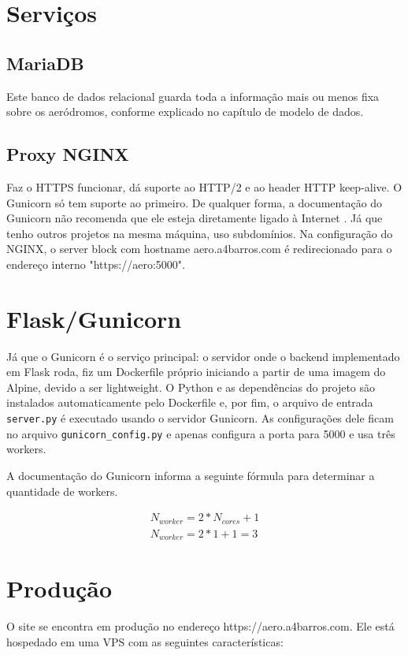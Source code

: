 \section{Serviços}

\subsection{MariaDB}
Este banco de dados relacional guarda toda a informação mais ou menos fixa sobre os aeródromos,
conforme explicado no capítulo de modelo de dados.

\subsection{Proxy NGINX}
Faz o HTTPS funcionar, dá suporte ao HTTP/2 e ao header HTTP keep-alive. O Gunicorn só tem suporte
ao primeiro. De qualquer forma, a documentação do Gunicorn não recomenda que ele esteja diretamente
ligado à Internet \cite{nginx-gunicorn}. Já que tenho outros projetos na mesma máquina, uso subdomínios.
Na configuração do NGINX, o server block com hostname aero.a4barros.com é redirecionado para 
o endereço interno "https://aero:5000".

\section{Flask/Gunicorn}

Já que o Gunicorn é o serviço principal: o servidor onde o backend implementado em Flask roda,
fiz um Dockerfile próprio iniciando a partir de uma imagem do Alpine, devido a ser lightweight.
O Python e as dependências do projeto são instalados automaticamente pelo Dockerfile e, por
fim, o arquivo de entrada \texttt{server.py} é executado usando o servidor Gunicorn. As configurações
dele ficam no arquivo \texttt{gunicorn\_config.py} e apenas configura a porta para 5000 e usa três workers.

A documentação do Gunicorn informa a seguinte fórmula para determinar a quantidade de workers. \cite{number-work}

\begin{equation} 
    \begin{split}
        N_{worker} = 2 * N_{cores} + 1 \\
        N_{worker} = 2 * 1 + 1 = 3 
    \end{split}
\end{equation}

\section{Produção}
O site se encontra em produção no endereço https://aero.a4barros.com. Ele está hospedado em uma VPS
com as seguintes características:

